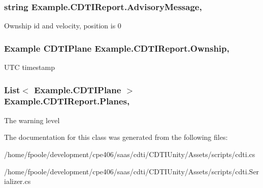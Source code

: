 \subsubsection[{Advisory\+Message}]{\setlength{\rightskip}{0pt plus 5cm}string Example.\+C\+D\+T\+I\+Report.\+Advisory\+Message\hspace{0.3cm}{\ttfamily [get]}, {\ttfamily [set]}}\label{class_example_1_1_c_d_t_i_report_aee90e745d98baa176941e916999248d9}


Ownship id and velocity, position is 0

\hypertarget{class_example_1_1_c_d_t_i_report_a069e31165b27ca17ba6efa26fdb763bd}{}
\subsubsection[{Ownship}]{\setlength{\rightskip}{0pt plus 5cm}Example {\bf C\+D\+T\+I\+Plane} Example.\+C\+D\+T\+I\+Report.\+Ownship\hspace{0.3cm}{\ttfamily [get]}, {\ttfamily [set]}}\label{class_example_1_1_c_d_t_i_report_a069e31165b27ca17ba6efa26fdb763bd}


U\+T\+C timestamp

\hypertarget{class_example_1_1_c_d_t_i_report_adeeec29b233bde873045cf173c7b462e}{}
\subsubsection[{Planes}]{\setlength{\rightskip}{0pt plus 5cm}List$<$ {\bf Example.\+C\+D\+T\+I\+Plane} $>$ Example.\+C\+D\+T\+I\+Report.\+Planes\hspace{0.3cm}{\ttfamily [get]}, {\ttfamily [set]}}\label{class_example_1_1_c_d_t_i_report_adeeec29b233bde873045cf173c7b462e}


The warning level



The documentation for this class was generated from the following files\+:\begin{DoxyCompactItemize}
\item 
/home/fpoole/development/cpe406/saas/cdti/\+C\+D\+T\+I\+Unity/\+Assets/scripts/cdti.\+cs\item 
/home/fpoole/development/cpe406/saas/cdti/\+C\+D\+T\+I\+Unity/\+Assets/scripts/cdti.\+Serializer.\+cs\end{DoxyCompactItemize}

